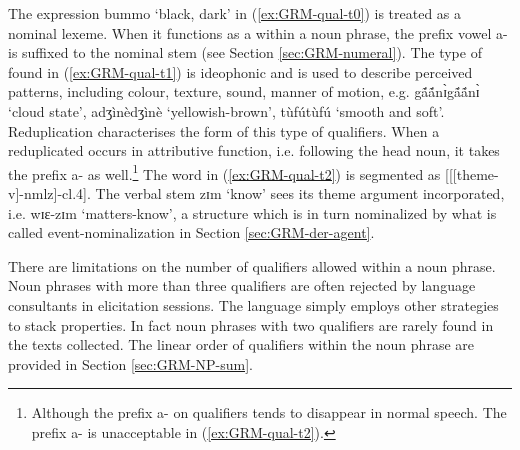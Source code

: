 \begin{exe}
\begin{exe}
\begin{exe}
\begin{exe}
\begin{exe}
\begin{exe}
\begin{exe}
\begin{exe}
\begin{exe}
The expression {\sls bummo} `black, dark'  in (\ref{ex:GRM-qual-t0}) is treated as a nominal lexeme. When it functions as a  within a noun phrase,  the prefix vowel {\sls a-} is suffixed to the nominal stem  (see Section \ref{sec:GRM-numeral}). The type of  found in (\ref{ex:GRM-qual-t1}) is ideophonic and is used to describe perceived patterns, including colour, texture, sound, manner of motion, e.g. {\sls gã́ã́nɪ̀gã́ã́nɪ̀} `cloud state',  {\sls adʒìnèdʒìnè} `yellowish-brown',  {\sls tùfútùfú} `smooth and soft'. Reduplication characterises the form of this type of qualifiers. When a reduplicated  occurs in attributive function, i.e. following the head noun, it takes the prefix {\sls a-} as well.\footnote{Although the prefix {\sls a-} on qualifiers tends to disappear in normal speech. The prefix {\sls a-} is unacceptable in (\ref{ex:GRM-qual-t2}).} The word in (\ref{ex:GRM-qual-t2}) is segmented as [[[{\sc theme}-v]-{\sc nmlz}]-{\sc cl.4}]. The verbal stem {\sls zɪm} `know'   sees  its theme argument incorporated, i.e.  {\sls wɪɛ-zɪm} `matters-know',  a structure which is in turn nominalized by what is called  event-nominalization in Section \ref{sec:GRM-der-agent}.  


There are  limitations on the number of qualifiers allowed within a noun phrase. Noun phrases with more than three qualifiers are often rejected by language consultants in elicitation sessions.  The language simply employs other strategies to stack properties. In fact noun phrases with two qualifiers are rarely found in the texts collected. The linear order of qualifiers within the noun phrase are provided in Section \ref{sec:GRM-NP-sum}.


\end{exe}
\end{exe}
\end{exe}
\end{exe}
\end{exe}
\end{exe}
\end{exe}
\end{exe}
\end{exe}

